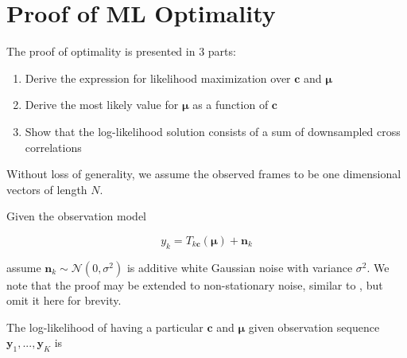 \documentclass{article}
\begin{document}

\section{Proof of ML Optimality}
\label{sec:optimality}

The proof of optimality is presented in 3 parts:

\begin{enumerate}
\item Derive the expression for likelihood maximization over $\bm{c}$ and $\bm{\mu}$
\item Derive the most likely value for $\bm{\mu}$ as a function of $\bm{c}$
\item Show that the log-likelihood solution consists of a sum of downsampled cross correlations
\end{enumerate}

Without loss of generality, we assume the observed frames to be one dimensional vectors of length $N$.

Given the observation model

\begin{equation*}
y_k = T_{k\bm{c}}(\bm{\mu}) + \bm{n}_k
\end{equation*}

assume $\bm{n}_k \sim \mathcal{N}(0, \sigma^2)$ is additive white Gaussian noise with variance $\sigma^2$.  We note that the proof may be extended to non-stationary noise, similar to \cite{gratadour2005sub}, but omit it here for brevity.


The log-likelihood of having a particular $\bm{c}$ and $\bm{\mu}$ given observation sequence $\bm{y}_1, ..., \bm{y}_K$ is
\end{document}
